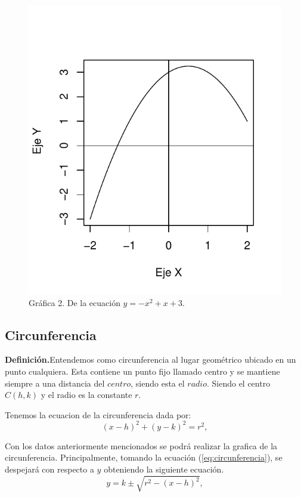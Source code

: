 \documentclass[12pt,a4paper]{report}
\begin{document}
\begin{figure}
\centering
\includegraphics[scale=0.8]{Parabola2}
\caption{Gráfica 2. De la ecuación $y = -x ^2 + x + 3$.}
\label{fig:Parabola2}
\end{figure}


\newpage
\subsection{Circunferencia} \label{subsec:circunferencia}

\textbf{Definición.}Entendemos como circunferencia al lugar geométrico ubicado en un punto cualquiera. Esta contiene un punto fijo llamado centro y se mantiene siempre a una distancia del $centro$, siendo esta el $radio$. 
Siendo el centro $C(h, k)$ y el radio es la constante $r$.

Tenemos la ecuacion de la circunferencia dada por:
\begin{equation}
(x - h)^2 + (y - k)^2 = r^2, \label{eq:circunferencia}
\end{equation}

Con los datos anteriormente mencionados se podrá realizar la grafica de la circunferencia. 
Principalmente, tomando la ecuación (\ref{eq:circunferencia}), se despejará con respecto a $y$ obteniendo la siguiente ecuación.
\begin{equation}
y = k \pm \sqrt{r^2 - (x - h)^2}, \label{eq:cdespejada}
\end{equation}
\end{document}
